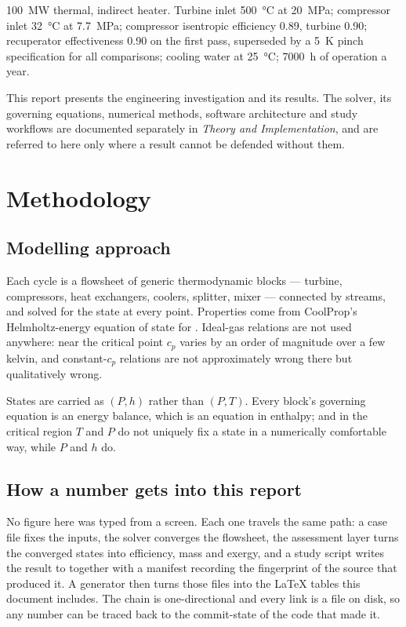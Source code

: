 \SI{100}{\mega\watt} thermal, indirect heater. Turbine inlet
\SI{500}{\celsius} at \SI{20}{\mega\pascal}; compressor inlet
\SI{32}{\celsius} at \SI{7.7}{\mega\pascal}; compressor isentropic
efficiency \num{0.89}, turbine \num{0.90}; recuperator effectiveness
\num{0.90} on the first pass, superseded by a \SI{5}{\kelvin} pinch
specification for all comparisons; cooling water at
\SI{25}{\celsius}; \SI{7000}{\hour} of operation a year.

\begin{caveat}[title={Scope of this report}]
This report presents the engineering investigation and its results. The
solver, its governing equations, numerical methods, software
architecture and study workflows are documented separately in
\emph{Theory and Implementation}, and are referred to here only where a
result cannot be defended without them.
\end{caveat}

\section{Methodology}

\subsection{Modelling approach}

Each cycle is a flowsheet of generic thermodynamic blocks --- turbine,
compressors, heat exchangers, coolers, splitter, mixer --- connected by
streams, and solved for the state at every point. Properties come from
CoolProp's Helmholtz-energy equation of state for . Ideal-gas
relations are not used anywhere: near the critical point $c_p$ varies by
an order of magnitude over a few kelvin, and constant-$c_p$ relations
are not approximately wrong there but qualitatively wrong.

States are carried as $(P,h)$ rather than $(P,T)$. Every block's
governing equation is an energy balance, which is an equation in
enthalpy; and in the critical region $T$ and $P$ do not uniquely fix a
state in a numerically comfortable way, while $P$ and $h$ do.

\subsection{How a number gets into this report}

No figure here was typed from a screen. Each one travels the same path:
a case file fixes the inputs, the solver converges the flowsheet, the
assessment layer turns the converged states into efficiency, mass and
exergy, and a study script writes the result to  together
with a manifest recording the fingerprint of the source that produced
it. A generator then turns those files into the \LaTeX{} tables this
document includes. The chain is one-directional and every link is a
file on disk, so any number can be traced back to the commit-state of
the code that made it.

